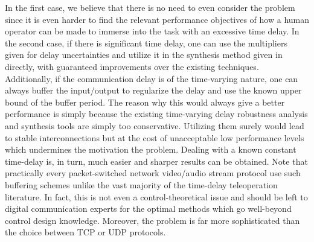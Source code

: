 In the first case, we believe that there is no need to even consider the problem since it is even harder to find the relevant performance 
objectives of how a human operator can be made to immerse into the task with an excessive time delay. In the second case, if there is 
significant time delay, one can use the multipliers given  for delay uncertainties and utilize it in the synthesis 
method given in  directly, with guaranteed improvements over the existing techniques. Additionally, if the communication 
delay is of the time-varying nature, one can always buffer the input/output to regularize the delay and use the known upper bound of the 
buffer period. The reason why this would always give a better performance is simply because the existing time-varying delay robustness analysis 
and synthesis tools are simply too conservative. Utilizing them surely would lead to stable interconnections but at the cost of unacceptable
low performance levels which undermines the motivation the problem. Dealing with a known constant time-delay is, in turn, much easier and 
sharper results can be obtained. Note that practically every packet-switched network video/audio stream protocol use such buffering schemes 
unlike the vast majority of the time-delay teleoperation literature. In fact, this is not even a control-theoretical issue and should be left 
to digital communication experts for the optimal methods which go well-beyond control design knowledge. Moreover, the problem is far more 
sophisticated than the choice between TCP or UDP protocols. 


